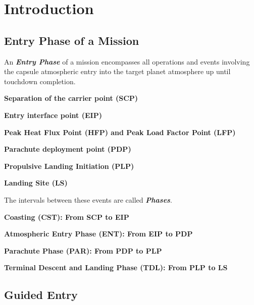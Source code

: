 \chapter{Introduction}

    \section{Entry Phase of a Mission}

        An \textbf{\textit{Entry Phase}} of a mission encompasses all operations and
        events involving the capsule atmospheric entry into the target planet
        atmosphere up until touchdown completion.

        \textbf{Separation of the carrier point (SCP)}

        \textbf{Entry interface point (EIP)}

        \textbf{Peak Heat Flux Point (HFP) and Peak Load Factor Point (LFP)}

        \textbf{Parachute deployment point (PDP)}

        \textbf{Propulsive Landing Initiation (PLP)}

        \textbf{Landing Site (LS)}

        The intervals between these events are called \textbf{\textit{Phases}}.

        \textbf{Coasting (CST): From SCP to EIP}

        \textbf{Atmospheric Entry Phase (ENT): From EIP to PDP}

        \textbf{Parachute Phase (PAR): From PDP to PLP}

        \textbf{Terminal Descent and Landing Phase (TDL): From PLP to LS}


    \section{Guided Entry}